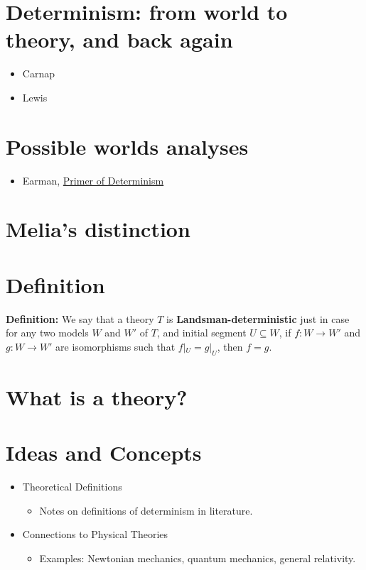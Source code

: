 \documentclass[11pt]{article}
\begin{document}
\section{Determinism: from world to theory, and back again}
\label{sec:org1756b0a}
\begin{itemize}
\item Carnap
\item Lewis
\end{itemize}

\section{Possible worlds analyses}
\label{sec:org2fcf17d}
\begin{itemize}
\item Earman, \uline{Primer of Determinism}
\end{itemize}



\section{Melia's distinction}
\label{sec:org12b27ef}


\section{Definition}
\label{sec:orgb587d8e}

\textbf{Definition:} We say that a theory \(T\) is \textbf{Landsman-deterministic}
  just in case for any two models \(W\) and \(W'\) of \(T\), and initial
  segment \(U\subseteq W\), if \(f:W\to W'\) and \(g:W\to W'\) are
  isomorphisms such that \(f|_U=g|_U\), then \(f=g\).


\section{What is a theory?}
\label{sec:org1b19d31}



\section{Ideas and Concepts}
\label{sec:org1faebd6}
\begin{itemize}
\item Theoretical Definitions
\begin{itemize}
\item Notes on definitions of determinism in literature.
\end{itemize}
\item Connections to Physical Theories
\begin{itemize}
\item Examples: Newtonian mechanics, quantum mechanics, general relativity.
\end{itemize}
\end{itemize}
\end{document}
